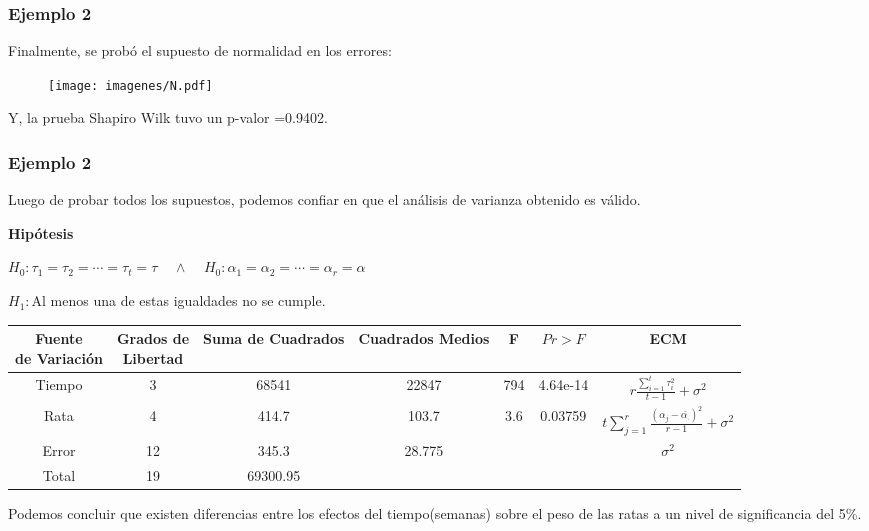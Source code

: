 \documentclass[12pt]{beamer}
\begin{document}
\begin{frame}
\frametitle{Ejemplo 2}
Finalmente, se probó el supuesto de normalidad en los errores:
\begin{figure}[h!]
  \centering
  \texttt{[image: imagenes/N.pdf]}
\end{figure}
Y, la prueba Shapiro Wilk tuvo un p-valor =0.9402.
\end{frame}

\begin{frame}
\frametitle{Ejemplo 2}
Luego de probar todos los supuestos, podemos confiar en que el análisis de varianza obtenido es válido.

\textbf{Hipótesis}
\begin{center}
$H_0:\tau_1=\tau_2=\cdots=\tau_t=\tau \;\;\;\; \wedge \;\;\;\; H_0:\alpha_1=\alpha_2=\cdots=\alpha_r=\alpha $

$H_1:$Al menos una de estas igualdades no se cumple.
\end{center}
\begin{table}[htbp]
  \centering
\resizebox{12cm}{!} {
\begin{tabular}{|c|c|c|c|c|c|c|}
\hline 
\parbox{7em}{\centering Fuente\\ de Variación} & \parbox{7em}{\centering Grados de\\ Libertad} & Suma de Cuadrados & Cuadrados Medios & F & $Pr>F$ & ECM \\ 
\hline 
Tiempo & 3 & 68541 & 22847 & 794 & 4.64e-14  & $r\frac{\sum\limits_{i=1}^{t}\tau_i^2}{t-1}+\sigma^2$\\ 
Rata & 4 & 414.7 & 103.7 & 3.6 & 0.03759 &$t\sum\limits_{j=1}^{r}\frac{(\alpha_{j}-\bar{\alpha_{.}})^2}{r-1}+\sigma^2$ \\
Error & 12 & 345.3 & 28.775 &   & & $\sigma^2$\\ 
Total & 19 & 69300.95 &  &   & &\\ 
\hline 
\end{tabular} 
}
\label{tab:addlabel}%
\end{table}%
Podemos concluir que existen diferencias entre los efectos del tiempo(semanas) sobre el peso de las ratas a un nivel de
significancia del 5\%.
\end{frame}
\end{document}
